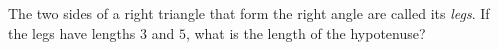 The two sides of a right triangle that form the right angle are called its \emph{legs}. If the legs have lengths $3$ and $5$, what is the length of the hypotenuse?
